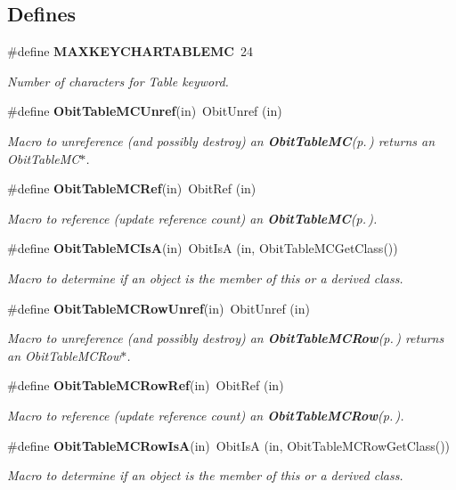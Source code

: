 \subsection*{Defines}
\begin{CompactItemize}
\item 
\#define {\bf MAXKEYCHARTABLEMC}\ 24
\begin{CompactList}\small\item\em Number of characters for Table keyword. \item\end{CompactList}\item 
\#define {\bf Obit\-Table\-MCUnref}(in)\ Obit\-Unref (in)
\begin{CompactList}\small\item\em Macro to unreference (and possibly destroy) an {\bf Obit\-Table\-MC}{\rm (p.\,\pageref{structObitTableMC})} returns an Obit\-Table\-MC$\ast$. \item\end{CompactList}\item 
\#define {\bf Obit\-Table\-MCRef}(in)\ Obit\-Ref (in)
\begin{CompactList}\small\item\em Macro to reference (update reference count) an {\bf Obit\-Table\-MC}{\rm (p.\,\pageref{structObitTableMC})}. \item\end{CompactList}\item 
\#define {\bf Obit\-Table\-MCIs\-A}(in)\ Obit\-Is\-A (in, Obit\-Table\-MCGet\-Class())
\begin{CompactList}\small\item\em Macro to determine if an object is the member of this or a derived class. \item\end{CompactList}\item 
\#define {\bf Obit\-Table\-MCRow\-Unref}(in)\ Obit\-Unref (in)
\begin{CompactList}\small\item\em Macro to unreference (and possibly destroy) an {\bf Obit\-Table\-MCRow}{\rm (p.\,\pageref{structObitTableMCRow})} returns an Obit\-Table\-MCRow$\ast$. \item\end{CompactList}\item 
\#define {\bf Obit\-Table\-MCRow\-Ref}(in)\ Obit\-Ref (in)
\begin{CompactList}\small\item\em Macro to reference (update reference count) an {\bf Obit\-Table\-MCRow}{\rm (p.\,\pageref{structObitTableMCRow})}. \item\end{CompactList}\item 
\#define {\bf Obit\-Table\-MCRow\-Is\-A}(in)\ Obit\-Is\-A (in, Obit\-Table\-MCRow\-Get\-Class())
\begin{CompactList}\small\item\em Macro to determine if an object is the member of this or a derived class. \item\end{CompactList}\end{CompactItemize}
